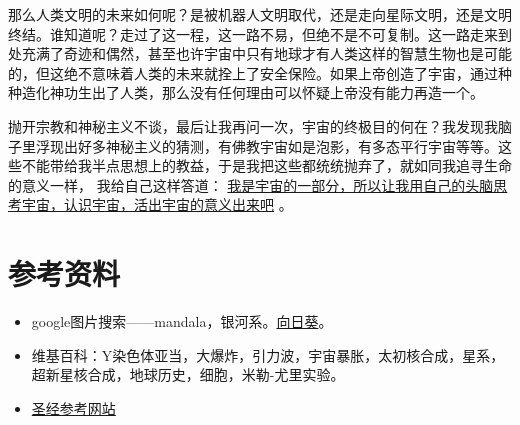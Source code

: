 \documentclass[11pt,oneside]{article}
\begin{document}
那么人类文明的未来如何呢？是被机器人文明取代，还是走向星际文明，还是文明终结。谁知道呢？走过了这一程，这一路不易，但绝不是不可复制。这一路走来到处充满了奇迹和偶然，甚至也许宇宙中只有地球才有人类这样的智慧生物也是可能的，但这绝不意味着人类的未来就拴上了安全保险。如果上帝创造了宇宙，通过种种造化神功生出了人类，那么没有任何理由可以怀疑上帝没有能力再造一个。

抛开宗教和神秘主义不谈，最后让我再问一次，宇宙的终极目的何在？我发现我脑子里浮现出好多神秘主义的猜测，有佛教宇宙如是泡影，有多态平行宇宙等等。这些不能带给我半点思想上的教益，于是我把这些都统统抛弃了，就如同我追寻生命的意义一样， 我给自己这样答道： \uline{我是宇宙的一部分，所以让我用自己的头脑思考宇宙，认识宇宙，活出宇宙的意义出来吧} 。



\section{参考资料}
\label{sec-9}
\begin{itemize}
\item google图片搜索——mandala，银河系。\href{http://amuseum.cdstm.cn/AMuseum/math/6/608/6_608_1002.htm}{向日葵}。
\item 维基百科：Y染色体亚当，大爆炸，引力波，宇宙暴胀，太初核合成，星系，超新星核合成，地球历史，细胞，米勒-尤里实验。
\item \href{http://bible.kuanye.net/hhb/}{圣经参考网站}
\end{itemize}
\end{document}
